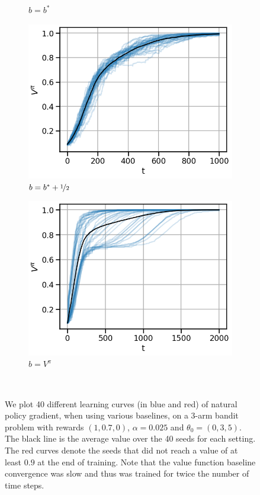 \begin{figure}[!ht]
\begin{subfigure}[b]{0.245\linewidth}
    \caption{$b = b^\ast$}
  \end{subfigure}
  \begin{subfigure}[b]{0.245\linewidth}
    \includegraphics[width=\textwidth]{articles/baselines/figs/appendix_figs_3arm_035/natural_minvar_05_eta=0025.png}
    \caption{$b = b^\ast + \nicefrac{1}{2}$}
  \end{subfigure}
  \begin{subfigure}[b]{0.245\linewidth}
    \includegraphics[width=\textwidth]{articles/baselines/figs/appendix_figs_3arm_035/natural_value_0_eta=0025.png}
    \caption{$b=V^\pi$}
  \end{subfigure}
  \caption{We plot 40 different learning curves (in blue and red) of natural policy gradient, when using various baselines, on a 3-arm bandit problem with rewards $(1, 0.7, 0)$, $\alpha = 0.025$ and $\theta_0 = (0, 3, 5)$. The black line is the average value over the 40 seeds for each setting. The red curves denote the seeds that did not reach a value of at least $0.9$ at the end of training. Note that the value function baseline convergence was slow and thus was trained for twice the number of time steps.}~\label{appfig:learning_curves_npg_035}
\end{figure}
